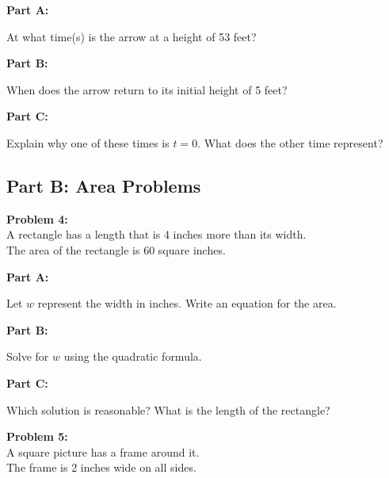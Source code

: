 \documentclass[12pt]{article}
\begin{document}
			\textbf{Part A:}
            
            At what time(s) is the arrow at a height of 53 feet?

			\vspace{5cm}

			\textbf{Part B:}
            
            When does the arrow return to its initial height of 5 feet?

			\vspace{5cm}

			\textbf{Part C:}
            
            Explain why one of these times is $t = 0$. What does the other time represent?

			\newpage

		\subsection*{Part B: Area Problems}

			\textbf{Problem 4:}\\

			A rectangle has a length that is 4 inches more than its width.\\

			The area of the rectangle is 60 square inches.

			\vspace{0.5cm}

			\textbf{Part A:}
            
            Let $w$ represent the width in inches. Write an equation for the area.

			\vspace{3cm}

			\textbf{Part B:}
            
            Solve for $w$ using the quadratic formula.

			\vspace{5cm}

			\textbf{Part C:}
            
            Which solution is reasonable? What is the length of the rectangle?

			\newpage

			\textbf{Problem 5:}\\

			A square picture has a frame around it.\\

			The frame is 2 inches wide on all sides.\\
\end{document}
